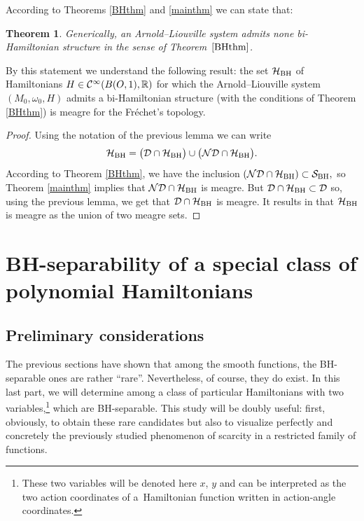 \documentclass[pdftex]{sigma}%
\numberwithin{equation}{section}
\newtheorem{Theorem}{Theorem}[section]
\begin{document}
According to Theorems \ref{BHthm} and \ref{mainthm} we can state that:

\begin{Theorem}\label{mainthmAL}
	Generically, an Arnold--Liouville system admits none bi-Hamiltonian structure in the sense of Theorem~$\ref{BHthm}$.
\end{Theorem}

By this statement we understand the following result: the set ${\cal H}_{\rm BH}$ of Hamiltonians $H\in{\cal C}^{\infty}(B(O,1),\mathbb{R})$ for which the Arnold--Liouville system $(M_0,\omega_0,H)$ admits a bi-Hamiltonian structure (with the conditions of Theorem \ref{BHthm}) is meagre for the Fr\'echet's topology.



\begin{proof}
	Using the notation of the previous lemma we can write
\begin{gather*}
{\cal H}_{\rm BH}=\big({\cal D}\cap{\cal H}_{\rm BH}\big)\cup\big({\cal ND}\cap{\cal H}_{\rm BH}\big).
\end{gather*}
	According to Theorem \ref{BHthm}, we have the inclusion
	$\left({\cal ND}\cap{\cal H}_{\rm BH}\right)\subset{\cal S}_{\rm BH},$
	so Theorem \ref{mainthm} implies that ${\cal ND}\cap{\cal H}_{\rm BH}$ is meagre.
	But ${\cal D}\cap{\cal H}_{\rm BH}\subset{\cal D}$ so, using the previous lemma, we get that ${\cal D}\cap{\cal H}_{\rm BH}$ is meagre. It results in that ${\cal H}_{\rm BH}$ is meagre as the union of two meagre sets.
\end{proof}

\section{BH-separability of a special class of polynomial Hamiltonians}

\subsection{Preliminary considerations}

The previous sections have shown that among the smooth functions, the BH-separable ones are rather ``rare''. Nevertheless, of course, they do exist. In this last part, we will determine among a class of particular Hamiltonians with two variables,\footnote{These two variables will be denoted here $x$, $y$ and can be interpreted as the two action coordinates of a~Hamiltonian function written in action-angle coordinates.} which are BH-separable. This study will be doubly useful: first, obviously, to obtain these rare candidates but also to visualize perfectly and concretely the previously studied phenomenon of scarcity in a restricted family of functions.
\end{document}

